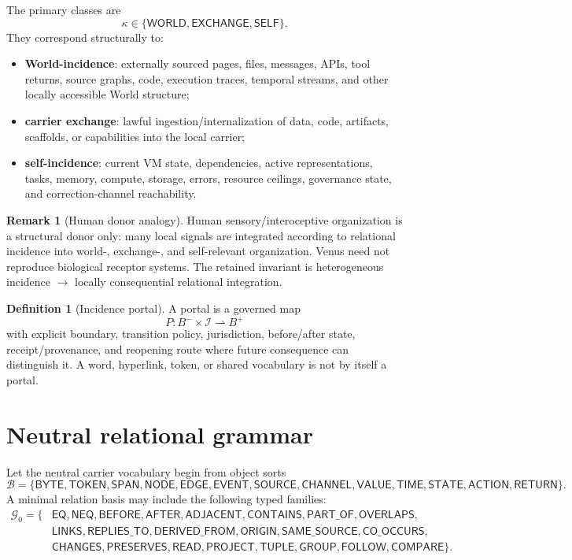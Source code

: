 \documentclass[10pt]{article}
\theoremstyle{venus}
\theoremstyle{definition}
\newtheorem{definition}[theorem]{Definition}
\newtheorem{remark}[theorem]{Remark}
\begin{document}
The primary classes are
\begin{equation}\label{eq:classes}
\kappa\in
\{\mathsf{WORLD},\mathsf{EXCHANGE},\mathsf{SELF}\}.
\end{equation}
They correspond structurally to:
\begin{itemize}
  \item \textbf{World-incidence}: externally sourced pages, files, messages,
  APIs, tool returns, source graphs, code, execution traces, temporal streams,
  and other locally accessible World structure;
  \item \textbf{carrier exchange}: lawful ingestion/internalization of data,
  code, artifacts, scaffolds, or capabilities into the local carrier;
  \item \textbf{self-incidence}: current VM state, dependencies, active
  representations, tasks, memory, compute, storage, errors, resource ceilings,
  governance state, and correction-channel reachability.
\end{itemize}

\begin{remark}[Human donor analogy]
Human sensory/interoceptive organization is a structural donor only: many local
signals are integrated according to relational incidence into world-, exchange-,
and self-relevant organization. Venus need not reproduce biological receptor
systems. The retained invariant is heterogeneous incidence $\to$ locally
consequential relational integration.
\end{remark}

\begin{definition}[Incidence portal]
A portal is a governed map
\[
P:B^{-}\times\mathcal I\rightharpoonup B^{+}
\]
with explicit boundary, transition policy, jurisdiction, before/after state,
receipt/provenance, and reopening route where future consequence can distinguish
it. A word, hyperlink, token, or shared vocabulary is not by itself a portal.
\end{definition}

\section{Neutral relational grammar}

Let the neutral carrier vocabulary begin from object sorts
\[
\mathcal B=
\{\mathsf{BYTE},\mathsf{TOKEN},\mathsf{SPAN},\mathsf{NODE},\mathsf{EDGE},
\mathsf{EVENT},\mathsf{SOURCE},\mathsf{CHANNEL},\mathsf{VALUE},\mathsf{TIME},
\mathsf{STATE},\mathsf{ACTION},\mathsf{RETURN}\}.
\]
A minimal relation basis may include the following typed families:
\[
\begin{aligned}
\mathcal G_0=\{&\mathsf{EQ},\mathsf{NEQ},\mathsf{BEFORE},\mathsf{AFTER},
\mathsf{ADJACENT},\mathsf{CONTAINS},\mathsf{PART\_OF},\mathsf{OVERLAPS},\\
&\mathsf{LINKS},\mathsf{REPLIES\_TO},\mathsf{DERIVED\_FROM},\mathsf{ORIGIN},
\mathsf{SAME\_SOURCE},\mathsf{CO\_OCCURS},\\
&\mathsf{CHANGES},\mathsf{PRESERVES},\mathsf{READ},\mathsf{PROJECT},
\mathsf{TUPLE},\mathsf{GROUP},\mathsf{FOLLOW},\mathsf{COMPARE}\}.
\end{aligned}
\]
\end{document}
